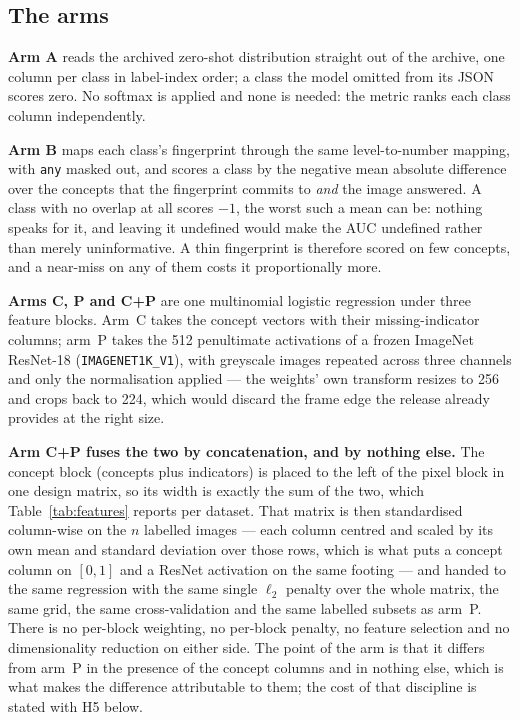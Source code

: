 \documentclass[11pt]{article}
\begin{document}
\subsection{The arms}

\textbf{Arm A} reads the archived zero-shot distribution straight out of the archive, one column
per class in label-index order; a class the model omitted from its JSON scores zero. No softmax is
applied and none is needed: the metric ranks each class column independently.

\textbf{Arm B} maps each class's fingerprint through the same level-to-number mapping, with
\texttt{any} masked out, and scores a class by the negative mean absolute difference over the
concepts that the fingerprint commits to \emph{and} the image answered. A class with no overlap at
all scores $-1$, the worst such a mean can be: nothing speaks for it, and leaving it undefined
would make the AUC undefined rather than merely uninformative. A thin fingerprint is therefore
scored on few concepts, and a near-miss on any of them costs it proportionally more.

\textbf{Arms C, P and C+P} are one multinomial logistic regression under three feature blocks.
Arm~C takes the concept vectors with their missing-indicator columns; arm~P takes the 512
penultimate activations of a frozen ImageNet ResNet-18 (\texttt{IMAGENET1K\_V1}), with greyscale
images repeated across three channels and only the normalisation applied --- the weights' own
transform resizes to 256 and crops back to 224, which would discard the frame edge the release
already provides at the right size.

\textbf{Arm C+P fuses the two by concatenation, and by nothing else.} The concept block
(concepts plus indicators) is placed to the left of the pixel block in one design matrix, so its
width is exactly the sum of the two, which Table~\ref{tab:features} reports per dataset. That
matrix is then standardised column-wise on the $n$ labelled images --- each column centred and
scaled by its own mean and standard deviation over those rows, which is what puts a concept column
on $[0,1]$ and a ResNet activation on the same footing --- and handed to the same regression with
the same single $\ell_2$ penalty over the whole matrix, the same grid, the same cross-validation
and the same labelled subsets as arm~P. There is no per-block weighting, no per-block penalty, no
feature selection and no dimensionality reduction on either side. The point of the arm is that it
differs from arm~P in the presence of the concept columns and in nothing else, which is what makes
the difference attributable to them; the cost of that discipline is stated with H5 below.
\end{document}
